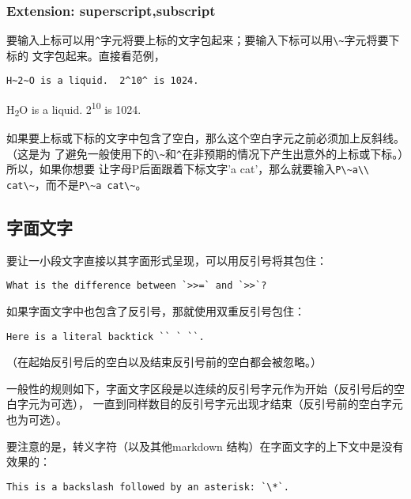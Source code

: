 \documentclass[fancyhdr,bookmark]{ctexbook}
\newcommand{\passthrough}[1]{#1}
\begin{document}
\hypertarget{extension-superscriptsubscript}{%
\subsubsection{Extension:
superscript,subscript}\label{extension-superscriptsubscript}}

要输入上标可以用\passthrough{\lstinline!^!}字元将要上标的文字包起来；要输入下标可以用\passthrough{\lstinline!\~!}字元将要下标的
文字包起来。直接看范例，

\begin{lstlisting}
H~2~O is a liquid.  2^10^ is 1024.
\end{lstlisting}

H\textsubscript{2}O is a liquid. 2\textsuperscript{10} is 1024.

如果要上标或下标的文字中包含了空白，那么这个空白字元之前必须加上反斜线。（这是为
了避免一般使用下的\passthrough{\lstinline!\~!}和\passthrough{\lstinline!^!}在非预期的情况下产生出意外的上标或下标。）所以，如果你想要
让字母P后面跟着下标文字'a
cat'，那么就要输入\passthrough{\lstinline!P\~a\\ cat\~!}，而不是\passthrough{\lstinline!P\~a cat\~!}。

\hypertarget{ux5b57ux9762ux6587ux5b57}{%
\subsection{字面文字}\label{ux5b57ux9762ux6587ux5b57}}

要让一小段文字直接以其字面形式呈现，可以用反引号将其包住：

\begin{lstlisting}
What is the difference between `>>=` and `>>`?
\end{lstlisting}

如果字面文字中也包含了反引号，那就使用双重反引号包住：

\begin{lstlisting}
Here is a literal backtick `` ` ``.
\end{lstlisting}

（在起始反引号后的空白以及结束反引号前的空白都会被忽略。）

一般性的规则如下，字面文字区段是以连续的反引号字元作为开始（反引号后的空白字元为可选），
一直到同样数目的反引号字元出现才结束（反引号前的空白字元也为可选）。

要注意的是，转义字符（以及其他markdown
结构）在字面文字的上下文中是没有效果的：

\begin{lstlisting}
This is a backslash followed by an asterisk: `\*`.
\end{lstlisting}
\end{document}
